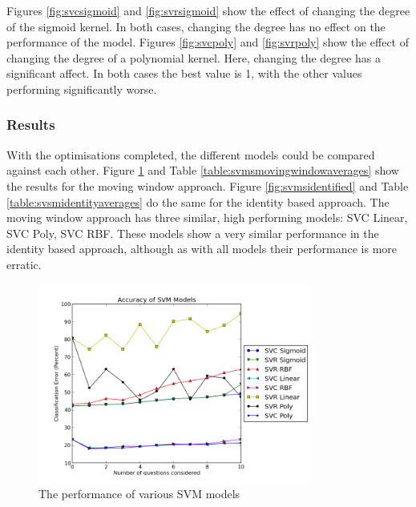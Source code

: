 Figures \ref{fig:svcsigmoid} and \ref{fig:svrsigmoid} show the effect of changing the degree of the sigmoid kernel. In both cases, changing the degree has no effect on the performance of the model. Figures \ref{fig:svcpoly} and \ref{fig:svrpoly} show the effect of changing the degree of a polynomial kernel. Here, changing the degree has a significant affect. In both cases the best value is 1, with the other values performing significantly worse.

\subsubsection{Results}
With the optimisations completed, the different models could be compared against each other. Figure \ref{fig:svmsmovingwindow} and Table \ref{table:svmsmovingwindowaverages} show the results for the moving window approach. Figure \ref{fig:svmsidentified} and Table \ref{table:svsmidentityaverages} do the same for the identity based approach. 
The moving window approach has three similar, high performing models: SVC Linear, SVC Poly, SVC RBF. These models show a very similar performance in the identity based approach, although as with all models their performance is more erratic.

\begin{figure}[h!]
\centering
\includegraphics[width=0.8\textwidth]{images/svmsmovingwindow.png}
\caption{The performance of various SVM models}
\label{fig:svmsmovingwindow}
\end{figure}

